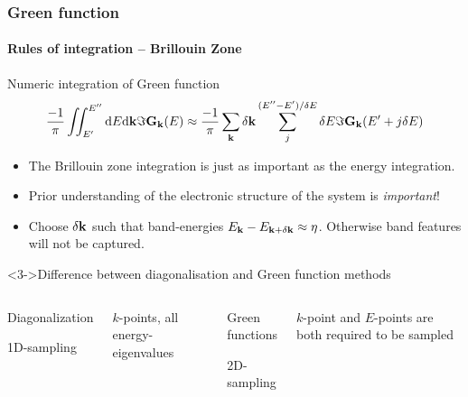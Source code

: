 \begin{frame}
  \frametitle{Green function}
  \framesubtitle{Rules of integration -- Brillouin Zone}


  \begin{block}{Numeric integration of Green function}
    \small 
    \begin{equation*}
      \frac{-1}\pi\iint_{E'}^{E''} \mathrm{d} E\mathrm{d} \mathbf{k}\Im \mathbf{G}_{\mathbf{k}}(E) \approx \frac{-1}\pi
      \sum_{\mathbf{k}}\delta\mathbf{k}\sum_j^{(E''-E')/\delta E} \delta E \Im \mathbf{G}_{\mathbf{k}}(E'+j\delta E)
    \end{equation*}

    \begin{itemize}
      \item%
      The Brillouin zone integration is just as important as the energy integration.

      \item%
      Prior understanding of the electronic structure of the system is \emph{important}! 

      \item<2->%
      Choose $\delta\mathbf{k}$ such that band-energies $E_{\mathbf{k}} -
      E_{\mathbf{k}+\delta\mathbf{k}}\approx \eta$. Otherwise band features will not be captured.
      
    \end{itemize}

  \end{block}

  \begin{block}<3->{Difference between diagonalisation and Green function methods}

    \begin{columns}[t]

      \begin{center}
        Diagonalization

        \Large 1D-sampling
      \end{center}

      $k$-points, all energy-eigenvalues


      \begin{center}
        Green functions

        \Large 2D-sampling
      \end{center}

      $k$-point and $E$-points are both required to be sampled

    \end{columns}
    
  \end{block}

\end{frame}


